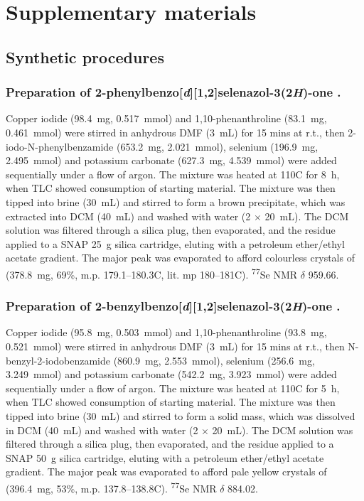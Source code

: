 \section{Supplementary materials}

\subsection{Synthetic procedures}


\subsubsection[Preparation of \refcmpd{ebs.ph}.]{Preparation of 2-phenylbenzo[\emph{d}][1,2]selenazol-3(2\emph{H})-one .}

Copper iodide (98.4~mg, 0.517~mmol) and 1,10-phenanthroline (83.1~mg, 0.461~mmol) were stirred in anhydrous DMF (3~mL) for 15 mins at r.t., then 2-iodo-N-phenylbenzamide (653.2~mg, 2.021~mmol), selenium (196.9~mg, 2.495~mmol) and potassium carbonate (627.3~mg, 4.539~mmol) were added sequentially under a flow of argon. 
The mixture was heated at 110\degree C for 8~h, when TLC showed consumption of starting material. 
The mixture was then tipped into brine (30~mL) and stirred to form a brown precipitate, which was extracted into DCM (40~mL) and washed with water (2 $\times$ 20~mL). 
The DCM solution was filtered through a silica plug, then evaporated, and the residue applied to a SNAP 25~g silica cartridge, eluting with a petroleum ether/ethyl acetate gradient. 
The major peak was evaporated to afford colourless crystals of  (378.8~mg, 69\%, m.p. 179.1--180.3\degree C, lit. mp 180--181\degree C). \textsuperscript{77}Se NMR $\delta$ 959.66.

\subsubsection[Preparation of \refcmpd{ebs.bn}.]{Preparation of 2-benzylbenzo[\emph{d}][1,2]selenazol-3(2\emph{H})-one .}

Copper iodide (95.8~mg, 0.503~mmol) and 1,10-phenanthroline (93.8~mg, 0.521~mmol) were stirred in anhydrous DMF (3~mL) for 15 mins at r.t., then N-benzyl-2-iodobenzamide (860.9~mg, 2.553~mmol), selenium (256.6~mg, 3.249~mmol) and potassium carbonate (542.2~mg, 3.923~mmol) were added sequentially under a flow of argon. 
The mixture was heated at 110\degree C for 5~h, when TLC showed consumption of starting material. 
The mixture was then tipped into brine (30~mL) and stirred to form a solid mass, which was dissolved in DCM (40~mL) and washed with water (2 $\times$ 20~mL). 
The DCM solution was filtered through a silica plug, then evaporated, and the residue applied to a SNAP 50~g silica cartridge, eluting with a petroleum ether/ethyl acetate gradient. 
The major peak was evaporated to afford pale yellow crystals of  (396.4~mg, 53\%, m.p. 137.8--138.8\degree C). \textsuperscript{77}Se NMR $\delta$ 884.02.

